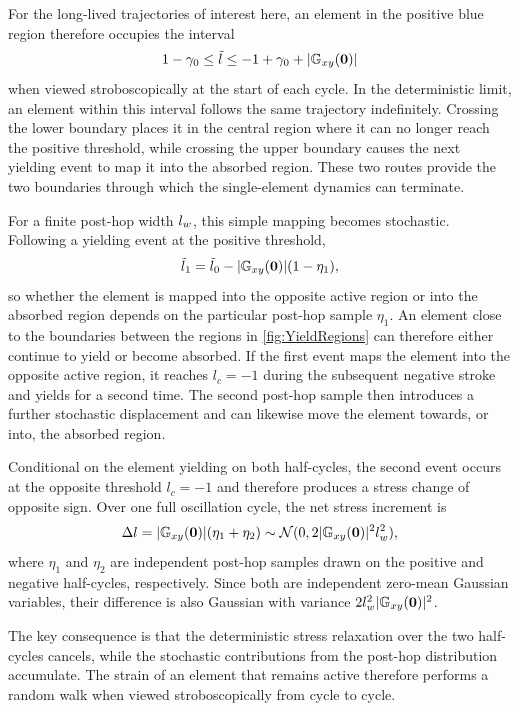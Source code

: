 For the long-lived trajectories of interest here, an element in the positive blue region therefore occupies the interval
\[
    1-\gamma_0
    \leq \tilde{l}
    \leq -1+\gamma_0+|\mathbb{G}_{xy}(\bm{0})|
\]
when viewed stroboscopically at the start of each cycle. In the deterministic limit, an element within this interval follows the same trajectory indefinitely. Crossing the lower boundary places it in the central region where it can no longer reach the positive threshold, while crossing the upper boundary causes the next yielding event to map it into the absorbed region. These two routes provide the two boundaries through which the single-element dynamics can terminate.

For a finite post-hop width $l_w$, this simple mapping becomes stochastic. Following a yielding event at the positive threshold,
\[
    \tilde{l}_1
    =
    \tilde{l}_0-|\mathbb{G}_{xy}(\bm{0})|(1-\eta_1),
\]
so whether the element is mapped into the opposite active region or into the absorbed region depends on the particular post-hop sample $\eta_1$. An element close to the boundaries between the regions in \cref{fig:YieldRegions} can therefore either continue to yield or become absorbed. If the first event maps the element into the opposite active region, it reaches $l_c=-1$ during the subsequent negative stroke and yields for a second time. The second post-hop sample then introduces a further stochastic displacement and can likewise move the element towards, or into, the absorbed region.

Conditional on the element yielding on both half-cycles, the second event occurs at the opposite threshold $l_c=-1$ and therefore produces a stress change of opposite sign. Over one full oscillation cycle, the net stress increment is
\[
    \Delta l = |\mathbb{G}_{xy}(\bm{0})|(\eta_1+\eta_2) \sim \mathcal{N}(0, 2|\mathbb{G}_{xy}(\bm{0})|^2l_w^2),
\] 
where $\eta_1$ and $\eta_2$ are independent post-hop samples drawn on the positive and negative half-cycles, respectively. Since both are independent zero-mean Gaussian variables, their difference is also Gaussian with variance $2l_w^2|\mathbb{G}_{xy}(\bm{0})|^2$.

The key consequence is that the deterministic stress relaxation over the two half-cycles cancels, while the stochastic contributions from the post-hop distribution accumulate. The strain of an element that remains active therefore performs a random walk when viewed stroboscopically from cycle to cycle.


